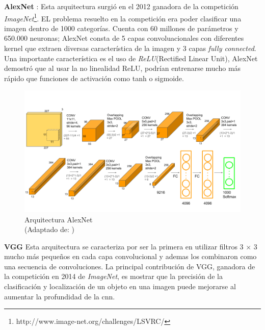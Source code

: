 \par \textbf{AlexNet} \citep{alexnet}: Esta arquitectura surgió en el 2012 ganadora de la competición \textit{ImageNet}\footnote{http://www.image-net.org/challenges/LSVRC/}. EL problema resuelto en la competición era poder clasificar una imagen dentro de 1000 categorías. Cuenta con 60 millones de parámetros y 650.000 neuronas; AlexNet consta de 5 capas convoluacionales con diferentes kernel que extraen diversas característica de la imagen  y 3 capas \textit{fully connected}. Una importante característica es el uso de \textit{ReLU}(Rectified Linear Unit),  AlexNet demostró que al usar la no linealidad ReLU,  podrían entrenarse mucho más rápido que  funciones de activación como  tanh o sigmoide.

\begin{figure}[H]
 \centering
  \includegraphics[scale=0.4,keepaspectratio=true,clip=true]{imagenes/MarcoTeorico/AlexNet-1.png}
  \caption{Arquitectura AlexNet \\ (Adaptado de: \citep{alexnet})}
	\label{Fig:alexnet}
\end{figure}


\par \textbf{VGG} \citep{vgg} Esta arquitectura se caracteriza por ser la primera en utilizar filtros 3 × 3 mucho más pequeños en cada capa convolucional y ademas los combinaron como una secuencia de convoluciones. La principal contribución de VGG, ganadora de la competición en 2014 de \textit{ImageNet}, es mostrar que la precisión de la clasificación y localización de un objeto en una imagen puede mejorarse al aumentar la profundidad de la \ac{cnn}.

